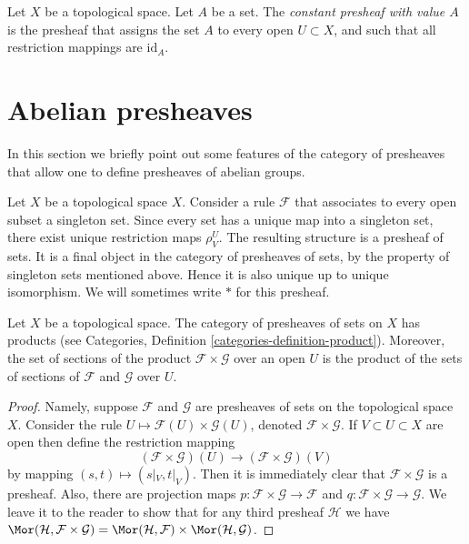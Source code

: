 \begin{definition}
\label{definition-constant-presheaf}
Let $X$ be a topological space. Let $A$ be a set.
The {\it constant presheaf with value $A$} is the
presheaf that assigns the set $A$ to every open
$U \subset X$, and such that all restriction mappings
are $\text{id}_A$.
\end{definition}

\section{Abelian presheaves}
\label{section-abelian-presheaves}

\noindent
In this section we briefly point out some features of the
category of presheaves that allow one to define presheaves
of abelian groups.

\begin{example}
\label{example-singleton-presheaf}
Let $X$ be a topological space $X$. Consider a rule $\mathcal{F}$ that
associates to every open subset a singleton set. Since every set
has a unique map into a singleton set, there exist unique restriction
maps $\rho^U_V$. The resulting structure is a presheaf of sets.
It is a final object in the category of presheaves of sets, by the
property of singleton sets mentioned above. Hence it is
also unique up to unique isomorphism. We will sometimes write $*$
for this presheaf.
\end{example}

\begin{lemma}
\label{lemma-product-presheaves}
Let $X$ be a topological space. The category of presheaves of sets
on $X$ has products (see
Categories, Definition \ref{categories-definition-product}).
Moreover, the set of
sections of the product $\mathcal{F} \times \mathcal{G}$
over an open $U$ is the product of the sets of sections of
$\mathcal{F}$ and $\mathcal{G}$ over $U$.
\end{lemma}

\begin{proof}
Namely, suppose $\mathcal{F}$ and $\mathcal{G}$ are
presheaves of sets on the topological space $X$.
Consider the rule $U \mapsto \mathcal{F}(U) \times \mathcal{G}(U)$,
denoted $\mathcal{F} \times \mathcal{G}$. If $V \subset U \subset X$
are open then define the restriction mapping
$$
(\mathcal{F} \times \mathcal{G})(U)
\longrightarrow
(\mathcal{F} \times \mathcal{G})(V)
$$
by mapping $(s, t) \mapsto (s|_V, t|_V)$. Then it is immediately
clear that $\mathcal{F} \times \mathcal{G}$ is a presheaf.
Also, there are projection maps
$p : \mathcal{F} \times \mathcal{G} \to \mathcal{F}$
and
$q : \mathcal{F} \times \mathcal{G} \to \mathcal{G}$.
We leave it to the reader to show that
for any third presheaf $\mathcal{H}$ we have
$\Mor(\mathcal{H}, \mathcal{F} \times \mathcal{G})
= \Mor(\mathcal{H}, \mathcal{F}) \times
\Mor(\mathcal{H}, \mathcal{G})$.
\end{proof}

